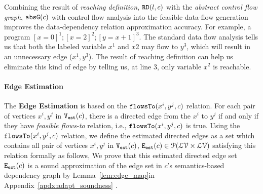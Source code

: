 Combining the result of \emph{reaching definition}, $\mathtt{RD}(l, c)$
with the \emph{abstract control flow graph}, $\mathtt{abs}{\mathtt{G}}(c)$ with control flow analysis into the feasible 
data-flow generation improves the data-dependency relation approximation accuracy. 
For example, a program $ [x = 0]^{1}; [x=2]^{2};  [y = x+1]^{3}$. 
The standard data flow analysis 
tells us that both the labeled variable $x^{1}$ and $x${2} may flow to $y^{3}$, which will result in an unnecessary edge ($x^{1}, y^{3}$). The result of reaching definition 
can help us eliminate this kind of edge by telling us, at line $3$, only variable $x^{2}$ is reachable. 
\paragraph{Edge Estimation}
The \textbf{Edge Estimation}
is based on the $\mathtt{flowsTo}(x^i, y^j, c)$ relation.
For each pair of vertices $x^i, y^j$ in $\mathtt{{V_{est}}}(c)$,
there is a directed edge from the $x^i$ to $y^j$ if and only if they have
\emph{feasible flows-to} relation, i.e., $\mathtt{flowsTo}(x^i, y^j, c)$ is true.
Using the $\mathtt{flowsTo}(x^i, y^j, c)$ relation, we define the estimated directed edges as a set which contains all
pair of vertices $x^i, y^j$ in $\mathtt{{V_{est}}}(c)$, 
$\mathtt{{E_{est}}}(c) \in \mathcal{P}( \mathcal{LV} \times \mathcal{LV})$
satisfying this relation formally as follows,
We prove that this estimated directed edge set $\mathtt{{E_{est}}}(c)$ is a sound approximation of the 
edge set in $c$'s semantics-based dependency graph 
by Lemma~\ref{lem:edge_map}in Appendix~\ref{apdx:adapt_soundness} .
